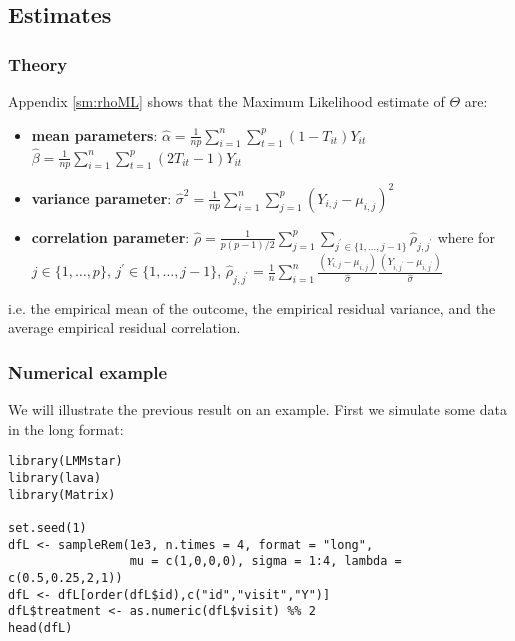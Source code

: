 \documentclass[12pt]{article}
\begin{document}
\clearpage

\subsection{Estimates}
\label{sec:org0723e73}

\subsubsection{Theory}
\label{sec:org49c0412}

Appendix \ref{sm:rhoML} shows that the Maximum Likelihood estimate of \(\Theta\) are:
\begin{itemize}
\item \textbf{mean parameters}: \(\widehat{\alpha}= \frac{1}{np} \sum_{i=1}^n
  \sum_{t=1}^p (1-T_{it}) Y_{it}\) \newline
{} \(\widehat{\beta}=
  \frac{1}{np} \sum_{i=1}^n \sum_{t=1}^p (2 T_{it}-1) Y_{it}\)
\item \textbf{variance parameter}: \(\widehat{\sigma}^2 =
  \frac{1}{np}\sum_{i=1}^n\sum_{j=1}^p (Y_{i,j}-\mu_{i,j})^2\)
\item \textbf{correlation parameter}: \(\widehat{\rho} =
  \frac{1}{p(p-1)/2}\sum_{j=1}^p \sum_{j^{\prime} \in
  \{1,\ldots,j-1\}}\widehat{\rho}_{j,j^{\prime}}\) \newline where for
\(j \in \{1,\ldots,p\}\), \(j^{\prime} \in \{1,\ldots,j-1\}\),
\(\widehat{\rho}_{j,j^{\prime}} = \frac{1}{n}\sum_{i=1}^n
  \frac{(Y_{i,j}-\mu_{i,j})}{\widehat{\sigma}}\frac{(Y_{i,j^{\prime}}-\mu_{i,j^{\prime}})}{\widehat{\sigma}}\)
\end{itemize}
i.e. the empirical mean of the outcome, the empirical residual
variance, and the average empirical residual correlation.

\subsubsection{Numerical example}
\label{sec:org36a375c}

We will illustrate the previous result on an example. First we
simulate some data in the long format:
\lstset{language=r,label= ,caption= ,captionpos=b,numbers=none}
\begin{lstlisting}
library(LMMstar)
library(lava)
library(Matrix)

set.seed(1)
dfL <- sampleRem(1e3, n.times = 4, format = "long",
                 mu = c(1,0,0,0), sigma = 1:4, lambda = c(0.5,0.25,2,1))
dfL <- dfL[order(dfL$id),c("id","visit","Y")]
dfL$treatment <- as.numeric(dfL$visit) %% 2
head(dfL)
\end{lstlisting}
\end{document}
